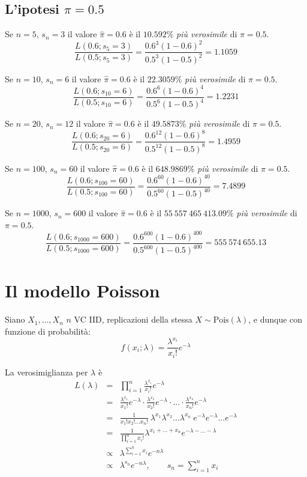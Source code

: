 \documentclass[
  11pt,
]{book}
\theoremstyle{mytheoremstyle}
\theoremstyle{mydefstyle}
\begin{document}
\subsection{\texorpdfstring{L'ipotesi \(\pi=0.5\)}{L'ipotesi \textbackslash pi=0.5}}\label{lipotesi-pi0.5}

Se \(n=5\), \(s_n=3\) il valore \(\hat\pi=0.6\) è il \(10.592\%\) \emph{più verosimile} di \(\pi=0.5\).
\[\frac{L(0.6;s_5=3)}{L(0.5;s_5=3)}=\frac{0.6^{3}(1-0.6)^{2}}{0.5^{3}(1-0.5)^{2}}=1.1059\]

Se \(n=10\), \(s_n=6\) il valore \(\hat\pi=0.6\) è il \(22.3059\%\) \emph{più verosimile} di \(\pi=0.5\).
\[\frac{L(0.6;s_{10}=6)}{L(0.5;s_{10}=6)}=\frac{0.6^{6}(1-0.6)^{4}}{0.5^{6}(1-0.5)^{4}}=1.2231\]

Se \(n=20\), \(s_n=12\) il valore \(\hat\pi=0.6\) è il \(49.5873\%\) \emph{più verosimile} di \(\pi=0.5\).
\[\frac{L(0.6;s_{20}=6)}{L(0.5;s_{20}=6)}=\frac{0.6^{12}(1-0.6)^{8}}{0.5^{12}(1-0.5)^{8}}=1.4959\]

Se \(n=100\), \(s_n=60\) il valore \(\hat\pi=0.6\) è il \(648.9869\%\) \emph{più verosimile} di \(\pi=0.5\).
\[\frac{L(0.6;s_{100}=60)}{L(0.5;s_{100}=60)}=\frac{0.6^{60}(1-0.6)^{40}}{0.5^{60}(1-0.5)^{40}}=7.4899\]

Se \(n=1000\), \(s_n=600\) il valore \(\hat\pi=0.6\) è il \(55~557~465~413.09\%\) \emph{più verosimile} di \(\pi=0.5\).
\[\frac{L(0.6;s_{1000}=600)}{L(0.5;s_{1000}=600)}=\frac{0.6^{600}(1-0.6)^{400}}{0.5^{600}(1-0.5)^{400}}=555~574~655.13\]

\section{Il modello Poisson}\label{il-modello-poisson}

Siano \(X_1,...,X_n\) \(n\) VC IID, replicazioni della stessa \(X\sim\text{Pois}(\lambda)\), e dunque con funzione di probabilità:
\[f(x_i;\lambda)=\frac{\lambda^{x_i}}{x_i!}e^{-\lambda}\]

La verosimiglianza per \(\lambda\) è
\begin{eqnarray*}
  L(\lambda) &=& \prod_{i=1}^n\frac{\lambda^{x_i}}{x_i!}e^{-\lambda}\\
             &=& \frac{\lambda^{x_1}}{x_1!}e^{-\lambda}\cdot \frac{\lambda^{x_2}}{x_2!}e^{-\lambda}\cdot ...\cdot \frac{\lambda^{x_n}}{x_n!}e^{-\lambda}\\
             &=& \frac{1}{x_1!x_2!...x_n!} ~ \lambda^{x_1}\lambda^{x_2}...\lambda^{x_n} ~ e^{-\lambda}e^{-\lambda}...e^{-\lambda}\\
             &=& \frac{1}{\prod_{i=1}^n x_i!} \lambda^{x_1+...+x_n} e^{-\lambda-...-\lambda}\\
             &\propto& \lambda^{\sum_{i=1}^n x_i} e^{-n\lambda}\\
             &\propto& \lambda^{s_n} e^{-n\lambda},\qquad s_n=\sum_{i=1}^n x_i
\end{eqnarray*}
\end{document}
